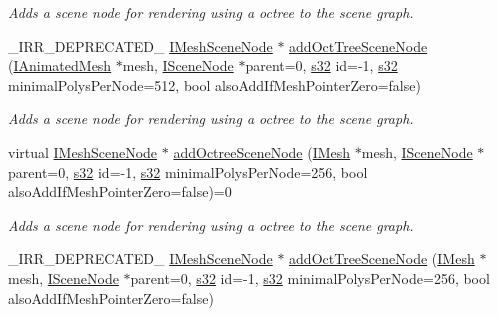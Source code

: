 \begin{DoxyCompactItemize}
\begin{DoxyCompactList}\small\item\em Adds a scene node for rendering using a octree to the scene graph. \end{DoxyCompactList}\item 
\+\_\+\+I\+R\+R\+\_\+\+D\+E\+P\+R\+E\+C\+A\+T\+E\+D\+\_\+ \hyperlink{classirr_1_1scene_1_1IMeshSceneNode}{I\+Mesh\+Scene\+Node} $\ast$ \hyperlink{classirr_1_1scene_1_1ISceneManager_ad976720f7b110b47374e129b29e4e572}{add\+Oct\+Tree\+Scene\+Node} (\hyperlink{classirr_1_1scene_1_1IAnimatedMesh}{I\+Animated\+Mesh} $\ast$mesh, \hyperlink{classirr_1_1scene_1_1ISceneNode}{I\+Scene\+Node} $\ast$parent=0, \hyperlink{namespaceirr_ac66849b7a6ed16e30ebede579f9b47c6}{s32} id=-\/1, \hyperlink{namespaceirr_ac66849b7a6ed16e30ebede579f9b47c6}{s32} minimal\+Polys\+Per\+Node=512, bool also\+Add\+If\+Mesh\+Pointer\+Zero=false)
\begin{DoxyCompactList}\small\item\em Adds a scene node for rendering using a octree to the scene graph. \end{DoxyCompactList}\item 
virtual \hyperlink{classirr_1_1scene_1_1IMeshSceneNode}{I\+Mesh\+Scene\+Node} $\ast$ \hyperlink{classirr_1_1scene_1_1ISceneManager_abfa8d1ebb1ff681d588aea98e6e2b193}{add\+Octree\+Scene\+Node} (\hyperlink{classirr_1_1scene_1_1IMesh}{I\+Mesh} $\ast$mesh, \hyperlink{classirr_1_1scene_1_1ISceneNode}{I\+Scene\+Node} $\ast$parent=0, \hyperlink{namespaceirr_ac66849b7a6ed16e30ebede579f9b47c6}{s32} id=-\/1, \hyperlink{namespaceirr_ac66849b7a6ed16e30ebede579f9b47c6}{s32} minimal\+Polys\+Per\+Node=256, bool also\+Add\+If\+Mesh\+Pointer\+Zero=false)=0
\begin{DoxyCompactList}\small\item\em Adds a scene node for rendering using a octree to the scene graph. \end{DoxyCompactList}\item 
\+\_\+\+I\+R\+R\+\_\+\+D\+E\+P\+R\+E\+C\+A\+T\+E\+D\+\_\+ \hyperlink{classirr_1_1scene_1_1IMeshSceneNode}{I\+Mesh\+Scene\+Node} $\ast$ \hyperlink{classirr_1_1scene_1_1ISceneManager_af2f5dfc8d5d0f525aee59058fd7457cd}{add\+Oct\+Tree\+Scene\+Node} (\hyperlink{classirr_1_1scene_1_1IMesh}{I\+Mesh} $\ast$mesh, \hyperlink{classirr_1_1scene_1_1ISceneNode}{I\+Scene\+Node} $\ast$parent=0, \hyperlink{namespaceirr_ac66849b7a6ed16e30ebede579f9b47c6}{s32} id=-\/1, \hyperlink{namespaceirr_ac66849b7a6ed16e30ebede579f9b47c6}{s32} minimal\+Polys\+Per\+Node=256, bool also\+Add\+If\+Mesh\+Pointer\+Zero=false)

\end{DoxyCompactItemize}
